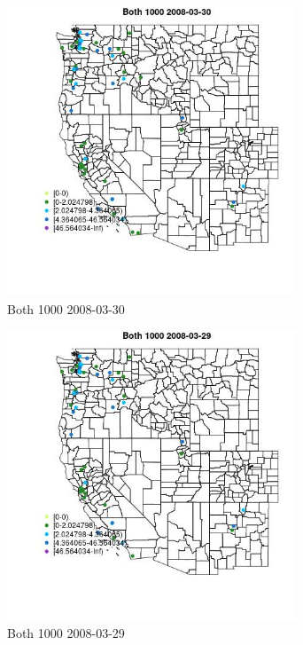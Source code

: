 \begin{figure} 
\centering  
\includegraphics[width=0.77\textwidth]{Code_Outputs/Report_ML_input_PM25_Step4_part_e_de_duplicated_aves_MapObsBoth_10002008-03-30.jpg} 
\caption{\label{fig:Report_ML_input_PM25_Step4_part_e_de_duplicated_avesMapObsBoth_10002008-03-30}Both 1000 2008-03-30} 
\end{figure} 
 

\begin{figure} 
\centering  
\includegraphics[width=0.77\textwidth]{Code_Outputs/Report_ML_input_PM25_Step4_part_e_de_duplicated_aves_MapObsBoth_10002008-03-29.jpg} 
\caption{\label{fig:Report_ML_input_PM25_Step4_part_e_de_duplicated_avesMapObsBoth_10002008-03-29}Both 1000 2008-03-29} 
\end{figure} 
 


